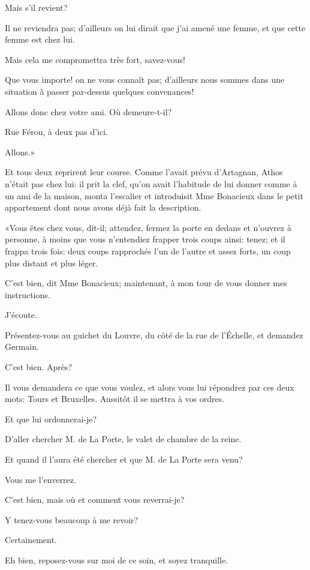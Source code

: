 \speak  Mais s'il revient? 

\speak  Il ne reviendra pas; d'ailleurs on lui dirait que j'ai amené une femme, et que cette femme est chez lui. 

\speak  Mais cela me compromettra très fort, savez-vous! 

\speak  Que vous importe! on ne vous connaît pas; d'ailleurs nous sommes dans une situation à passer par-dessus quelques convenances! 

\speak  Allons donc chez votre ami. Où demeure-t-il? 

\speak  Rue Férou, à deux pas d'ici. 

\speak  Allons.» 

Et tous deux reprirent leur course. Comme l'avait prévu d'Artagnan, Athos n'était pas chez lui: il prit la clef, qu'on avait l'habitude de lui donner comme à un ami de la maison, monta l'escalier et introduisit Mme Bonacieux dans le petit appartement dont nous avons déjà fait la description. 

«Vous êtes chez vous, dit-il; attendez, fermez la porte en dedans et n'ouvrez à personne, à moins que vous n'entendiez frapper trois coups ainsi: tenez; et il frappa trois fois: deux coups rapprochés l'un de l'autre et assez forts, un coup plus distant et plus léger. 

\speak  C'est bien, dit Mme Bonacieux; maintenant, à mon tour de vous donner mes instructions. 

\speak  J'écoute. 

\speak  Présentez-vous au guichet du Louvre, du côté de la rue de l'Échelle, et demandez Germain. 

\speak  C'est bien. Après? 

\speak  Il vous demandera ce que vous voulez, et alors vous lui répondrez par ces deux mots: Tours et Bruxelles. Aussitôt il se mettra à vos ordres. 

\speak  Et que lui ordonnerai-je? 

\speak  D'aller chercher M. de La Porte, le valet de chambre de la reine. 

\speak  Et quand il l'aura été chercher et que M. de La Porte sera venu? 

\speak  Vous me l'enverrez. 

\speak  C'est bien, mais où et comment vous reverrai-je? 

\speak  Y tenez-vous beaucoup à me revoir? 

\speak  Certainement. 

\speak  Eh bien, reposez-vous sur moi de ce soin, et soyez tranquille. 

